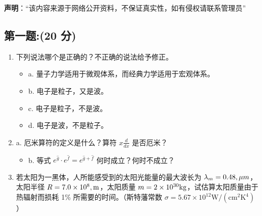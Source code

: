 
\textbf{声明}：“该内容来源于网络公开资料，不保证真实性，如有侵权请联系管理员”

\subsection{第一题:(20 分)}
\begin{enumerate}
  \item 下列说法哪个是正确的？不正确的说法给予修正。
  \begin{itemize}
    \item a. 量子力学适用于微观体系，而经典力学适用于宏观体系。
    \item b. 电子是粒子，又是波。
    \item c. 电子是粒子，不是波。
    \item d. 电子是波，不是粒子。
  \end{itemize}
  
  \item a. 厄米算符的定义是什么？算符 $x \frac{d}{dx}$ 是否厄米？
  \begin{itemize}
    \item b. 等式 $e^{\hat g} \cdot e^{\hat f} = e^{\hat g+\hat f}$ 何时成立？何时不成立？
  \end{itemize}
  
  \item 若太阳为一黑体，人所能感受到的太阳光能量的最大波长为 $\lambda_m = 0.48 \\, \mu m$，太阳半径 $R = 7.0 \times 10^8 \\, \text{m}$，太阳质量 $m = 2 \times 10^{30} \\ \text{kg}$，试估算太阳质量由于热辐射而损耗 1\% 所需要的时间。（斯特藩常数 $\sigma = 5.67 \times 10^{12}  \text{W} / (\text{cm}^2  \text{K}^4)$）
\end{enumerate}